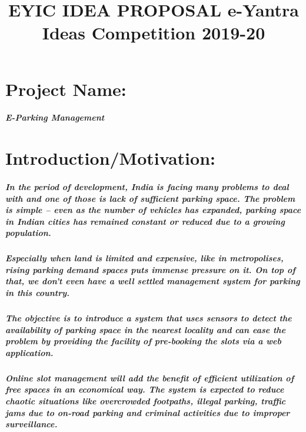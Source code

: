 \documentclass[]{article}
\author{ }
\title{EYIC IDEA PROPOSAL
	\linebreak 
	e-Yantra Ideas Competition 2019-20}
\date{}
\begin{document}
\maketitle{}
\section{Project Name:}
\subparagraph{E-Parking Management}

\section{Introduction/Motivation:}
\subparagraph{In the period of development, India is facing many problems to deal with and one of those is lack of sufficient parking space. The problem is simple – even as the number of vehicles has expanded, parking space in Indian cities has remained constant or reduced due to a growing population.}
\subparagraph{Especially when land is limited and expensive, like in metropolises, rising parking demand spaces puts immense pressure on it. On top of that, we don’t even have a well settled management system for parking in this country.}
\subparagraph{The objective is to introduce a system that uses sensors to detect the availability of parking space in the nearest locality and can ease the problem by providing the facility of pre-booking the slots via a web application.}
\subparagraph{Online slot management will add the benefit of efficient utilization of free spaces in an economical way. The system is expected to reduce chaotic situations like overcrowded footpaths, illegal parking, traffic jams due to on-road parking and criminal activities due to improper surveillance.}
\end{document}
